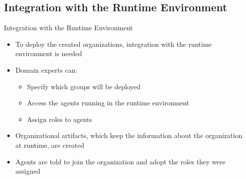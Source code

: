 \subsection{Integration with the Runtime Environment}
\begin{frame}{Integration with the Runtime Environment}
    \begin{itemize}
        \item To deploy the created organizations, integration with the runtime environment is needed
        \item Domain experts can:
        \begin{itemize}
            \item Specify which groups will be deployed
            \item Access the agents running in the runtime environment
            \item Assign roles to agents
        \end{itemize}
        \item {Organizational artifacts}, which keep the information about the organization at runtime, are created
        \item Agents are told to join the organization and adopt the roles they were assigned
    \end{itemize}
\end{frame}